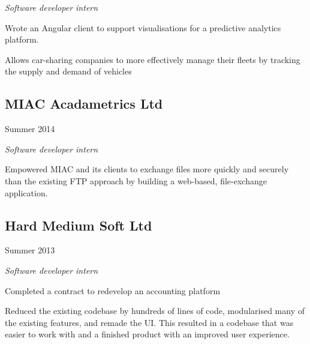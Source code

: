 \emph{Software developer intern}

\begin{itemize}
  {\small
  \item Wrote an Angular client to support visualisations for a predictive
    analytics platform.
  \item Allows car-sharing companies to more effectively manage their fleets by
    tracking the supply and demand of vehicles
  }
\end{itemize}

\noindent\begin{minipage}[t]{0.5\textwidth}
  \subsection*{MIAC Acadametrics Ltd}
\end{minipage}
\noindent\begin{minipage}[t]{0.5\textwidth}
  \flushright
  Summer 2014
\end{minipage}

\emph{Software developer intern}

\begin{itemize}
  {\small
  \item Empowered MIAC and its clients to exchange files more quickly and
    securely than the existing FTP approach by building a web-based,
    file-exchange application.
  }
\end{itemize}

\noindent\begin{minipage}[t]{0.5\textwidth}
  \subsection*{Hard Medium Soft Ltd}
\end{minipage}
\noindent\begin{minipage}[t]{0.5\textwidth}
  \flushright
  Summer 2013
\end{minipage}

\emph{Software developer intern}

\begin{itemize}
  {\small
  \item Completed a contract to redevelop an accounting platform
  \item Reduced the existing codebase by hundreds of lines of code, modularised
    many of the existing features, and remade the UI. This resulted in a
    codebase that was easier to work with and a finished product with an
    improved user experience.
  }
\end{itemize}

